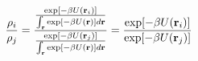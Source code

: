 \documentclass[12pt]{article}
\begin{document}
\begin{displaymath}
{{\rho_i}\over{\rho_j}} = 
{
{
{
\exp[-\beta U({\bf r}_i)]
}
\over
{
\int_{\bf r}
{ \exp[-\beta U({\bf r}) ] }
d{\bf r}
}
}
\over
{
{
\exp[-\beta U({\bf r}_j)]
}
\over
{
\int_{\bf r}
{ \exp[-\beta U({\bf r}) ] }
d{\bf r}
}
}
}
=
{
{\exp[-\beta U({\bf r}_i)]}
\over
{\exp[-\beta U({\bf r}_j)]}
}
\end{displaymath}
\end{document}
